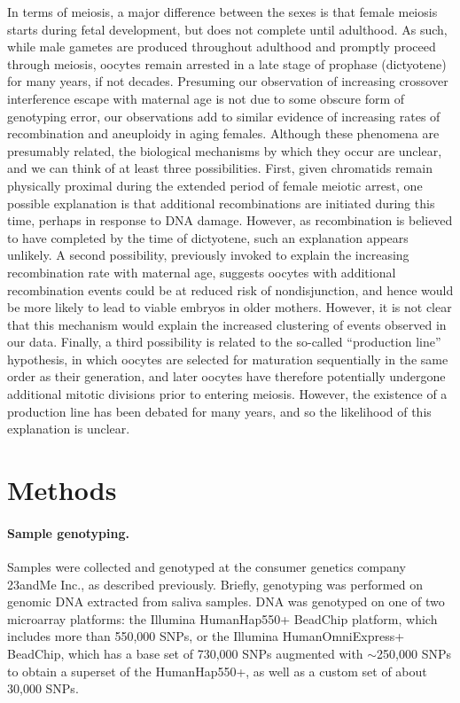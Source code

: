 In terms of meiosis, a major difference between the sexes is that
female meiosis starts during fetal development, but does not
complete until adulthood. As such, while male gametes are
produced throughout adulthood and promptly proceed through
meiosis, oocytes remain arrested in a late stage of prophase
(dictyotene) for many years, if not decades. Presuming our
observation of increasing crossover interference escape with
maternal age is not due to some obscure form of genotyping
error, our observations add to similar evidence of increasing rates
of recombination\cite{Kong2004} and aneuploidy\cite{Hassold2001} in aging females. Although
these phenomena are presumably related, the biological
mechanisms by which they occur are unclear, and we can think
of at least three possibilities. First, given chromatids remain
physically proximal during the extended period of female meiotic
arrest, one possible explanation is that additional recombinations
are initiated during this time, perhaps in response to
DNA damage. However, as recombination is believed to have
completed by the time of dictyotene, such an explanation appears
unlikely. A second possibility, previously invoked to explain the
increasing recombination rate with maternal age\cite{Kong2004}, suggests
oocytes with additional recombination events could be at
reduced risk of nondisjunction, and hence would be more likely
to lead to viable embryos in older mothers. However, it is not
clear that this mechanism would explain the increased clustering
of events observed in our data. Finally, a third possibility is 
related to the so-called ``production line'' hypothesis, in which
oocytes are selected for maturation sequentially in the same order
as their generation, and later oocytes have therefore potentially
undergone additional mitotic divisions prior to entering
meiosis\cite{Reizel2012}. However, the existence of a production line has been
debated for many years\cite{Reizel2012,Polani1991,Rowsey2014}, and so the likelihood of this
explanation is unclear.

\section{Methods}

\paragraph{Sample genotyping.} Samples were collected and genotyped at the consumer
genetics company 23andMe Inc., as described previously\cite{Eriksson2010}. Briefly, genotyping was
performed on genomic DNA extracted from saliva samples. DNA was genotyped
on one of two microarray platforms: the Illumina HumanHap550+ BeadChip
platform, which includes more than 550,000 SNPs, or the Illumina
HumanOmniExpress+ BeadChip, which has a base set of 730,000 SNPs
augmented with $\sim$250,000 SNPs to obtain a superset of the HumanHap550+,
as well as a custom set of about 30,000 SNPs.

